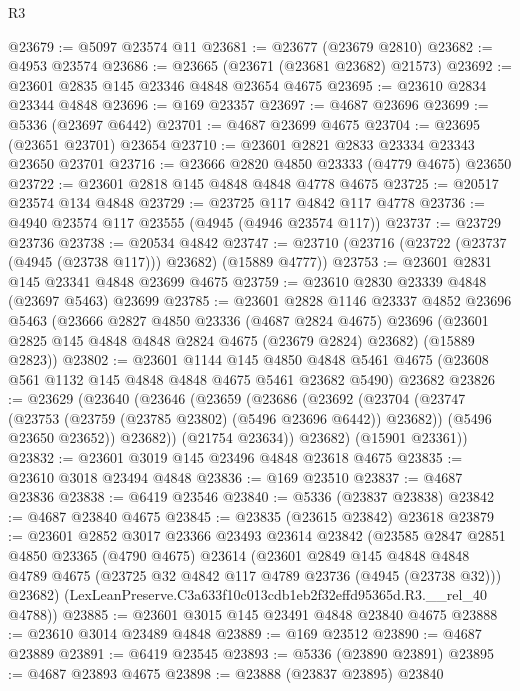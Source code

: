\begin{lexlean}{R3}
\begin{coremodule}
@23679 := @5097 @23574 @11
@23681 := @23677 (@23679 @2810)
@23682 := @4953 @23574
@23686 := @23665 (@23671 (@23681 @23682) @21573)
@23692 := @23601 @2835 @145 @23346 @4848 @23654 @4675
@23695 := @23610 @2834 @23344 @4848
@23696 := @169 @23357
@23697 := @4687 @23696
@23699 := @5336 (@23697 @6442)
@23701 := @4687 @23699 @4675
@23704 := @23695 (@23651 @23701) @23654
@23710 := @23601 @2821 @2833 @23334 @23343 @23650 @23701
@23716 := @23666 @2820 @4850 @23333 (@4779 @4675) @23650
@23722 := @23601 @2818 @145 @4848 @4848 @4778 @4675
@23725 := @20517 @23574 @134 @4848
@23729 := @23725 @117 @4842 @117 @4778
@23736 := @4940 @23574 @117 @23555 (@4945 (@4946 @23574 @117))
@23737 := @23729 @23736
@23738 := @20534 @4842
@23747 := @23710 (@23716 (@23722 (@23737 (@4945 (@23738 @117))) @23682) (@15889 @4777))
@23753 := @23601 @2831 @145 @23341 @4848 @23699 @4675
@23759 := @23610 @2830 @23339 @4848 (@23697 @5463) @23699
@23785 := @23601
    @2828
    @1146
    @23337
    @4852
    @23696
    @5463
    (@23666
      @2827
      @4850
      @23336
      (@4687 @2824 @4675)
      @23696
      (@23601 @2825 @145 @4848 @4848 @2824 @4675 (@23679 @2824) @23682)
      (@15889 @2823))
@23802 := @23601
    @1144
    @145
    @4850
    @4848
    @5461
    @4675
    (@23608 @561 @1132 @145 @4848 @4848 @4675 @5461 @23682 @5490)
    @23682
@23826 := @23629
    (@23640
      (@23646
        (@23659
          (@23686
            (@23692
              (@23704
                (@23747 (@23753 (@23759 (@23785 @23802) (@5496 @23696 @6442)) @23682))
                (@5496 @23650 @23652))
              @23682))
          (@21754 @23634))
        @23682)
      (@15901 @23361))
@23832 := @23601 @3019 @145 @23496 @4848 @23618 @4675
@23835 := @23610 @3018 @23494 @4848
@23836 := @169 @23510
@23837 := @4687 @23836
@23838 := @6419 @23546
@23840 := @5336 (@23837 @23838)
@23842 := @4687 @23840 @4675
@23845 := @23835 (@23615 @23842) @23618
@23879 := @23601
    @2852
    @3017
    @23366
    @23493
    @23614
    @23842
    (@23585
      @2847
      @2851
      @4850
      @23365
      (@4790 @4675)
      @23614
      (@23601
        @2849
        @145
        @4848
        @4848
        @4789
        @4675
        (@23725 @32 @4842 @117 @4789 @23736 (@4945 (@23738 @32)))
        @23682)
      (LexLeanPreserve.C3a633f10c013cdb1eb2f32effd95365d.R3.__rel_40 @4788))
@23885 := @23601 @3015 @145 @23491 @4848 @23840 @4675
@23888 := @23610 @3014 @23489 @4848
@23889 := @169 @23512
@23890 := @4687 @23889
@23891 := @6419 @23545
@23893 := @5336 (@23890 @23891)
@23895 := @4687 @23893 @4675
@23898 := @23888 (@23837 @23895) @23840

\end{coremodule}
\end{lexlean}
